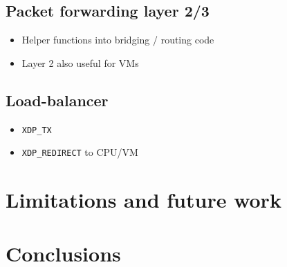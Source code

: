 \documentclass[10pt,sigconf]{acmart}
\begin{document}
\subsection{Packet forwarding layer 2/3}
\label{sec:org3681460}
\begin{itemize}
\item Helper functions into bridging / routing code
\item Layer 2 also useful for VMs
\end{itemize}
\subsection{Load-balancer}
\label{sec:org685e28c}
\begin{itemize}
\item \texttt{XDP\_TX}
\item \texttt{XDP\_REDIRECT} to CPU/VM
\end{itemize}

\section{Limitations and future work}
\label{sec:limitations}


\section{Conclusions}
\label{sec:conclusion}







\end{document}
